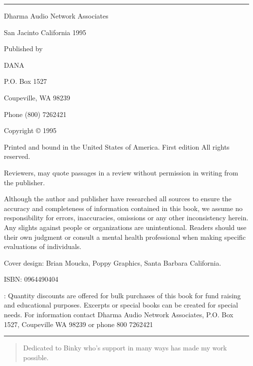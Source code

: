 \documentclass[a5paper,10pt,english]{book}
\begin{document}
\bigskip\hrule\bigskip


\begin{DUlineblock}{0em}
\item[] Dharma Audio Network Associates
\item[] San Jacinto California 1995
\end{DUlineblock}

\begin{DUlineblock}{0em}
\item[] Published by
\item[] DANA
\item[] P.O. Box 1527
\item[] Coupeville, WA 98239
\item[] Phone (800) 726\sphinxhyphen{}2421
\item[] Copyright © 1995
\end{DUlineblock}

\sphinxAtStartPar
Printed and bound in the United States of America. First edition All rights reserved.

\sphinxAtStartPar
Reviewers, may quote passages in a review without permission in writing from the publisher.

\sphinxAtStartPar
Although the author and publisher have researched all sources to ensure the accuracy and completeness of information contained in this book, we assume no responsibility for errors, inaccuracies, omissions or any other inconsistency herein. Any slights against people or organizations are unintentional. Readers should use their own judgment or consult a mental health professional when making specific evaluations of individuals.

\sphinxAtStartPar
Cover design: Brian Moucka, Poppy Graphics, Santa Barbara California.

\sphinxAtStartPar
ISBN: 0\sphinxhyphen{}9644904\sphinxhyphen{}0\sphinxhyphen{}4

\sphinxAtStartPar
{}: Quantity discounts are offered for bulk purchases of this book for fund raising and educational purposes. Excerpts or special books can be created for special needs. For information contact Dharma Audio Network Associates, P.O. Box 1527, Coupeville WA 98239 or phone 800 726\sphinxhyphen{}2421


\bigskip\hrule\bigskip

\begin{quote}

\sphinxAtStartPar
Dedicated to Binky who’s support in many ways has made my work possible.
\end{quote}
\end{document}
